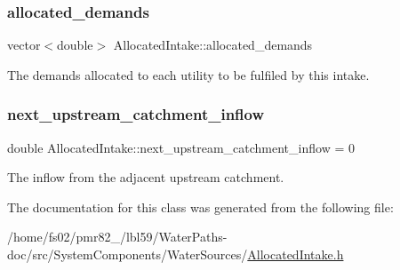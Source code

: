 \subsubsection{\texorpdfstring{allocated\+\_\+demands}{allocated\_demands}}
{\footnotesize\ttfamily vector$<$double$>$ Allocated\+Intake\+::allocated\+\_\+demands}



The demands allocated to each utility to be fulfiled by this intake. 

\mbox{\label{classAllocatedIntake_acf0824f3602cf6e9aa5c4423cb04f078}} 
\subsubsection{\texorpdfstring{next\+\_\+upstream\+\_\+catchment\+\_\+inflow}{next\_upstream\_catchment\_inflow}}
{\footnotesize\ttfamily double Allocated\+Intake\+::next\+\_\+upstream\+\_\+catchment\+\_\+inflow = 0}



The inflow from the adjacent upstream catchment. 



The documentation for this class was generated from the following file\+:\begin{DoxyCompactItemize}
\item 
/home/fs02/pmr82\+\_/lbl59/\+Water\+Paths-\/doc/src/\+System\+Components/\+Water\+Sources/\mbox{\hyperlink{AllocatedIntake_8h}{Allocated\+Intake.\+h}}\end{DoxyCompactItemize}
